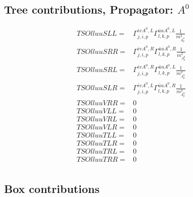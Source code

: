\documentclass[A4,landscape]{article}
\begin{document}
\subsection{Tree contributions, Propagator: $A^0$} 

\begin{align} 
  TSOlluuSLL= & \Gamma^{\bar{e}e A^0 ,L}_{j, i, p} \Gamma^{\bar{u}u A^0 ,L}_{l, k, p} \frac{1}{m^2_{A^0_{{p}}}} \\ 
  TSOlluuSRR= & \Gamma^{\bar{e}e A^0 ,R}_{j, i, p} \Gamma^{\bar{u}u A^0 ,R}_{l, k, p} \frac{1}{m^2_{A^0_{{p}}}} \\ 
  TSOlluuSRL= & \Gamma^{\bar{e}e A^0 ,R}_{j, i, p} \Gamma^{\bar{u}u A^0 ,L}_{l, k, p} \frac{1}{m^2_{A^0_{{p}}}} \\ 
  TSOlluuSLR= & \Gamma^{\bar{e}e A^0 ,L}_{j, i, p} \Gamma^{\bar{u}u A^0 ,R}_{l, k, p} \frac{1}{m^2_{A^0_{{p}}}} \\ 
  TSOlluuVRR= & 0 \\ 
  TSOlluuVLL= & 0 \\ 
  TSOlluuVRL= & 0 \\ 
  TSOlluuVLR= & 0 \\ 
  TSOlluuTLL= & 0 \\ 
  TSOlluuTLR= & 0 \\ 
  TSOlluuTRL= & 0 \\ 
  TSOlluuTRR= & 0 \\ 
\end{align} 
\subsection{Box contributions} 
\end{document}
